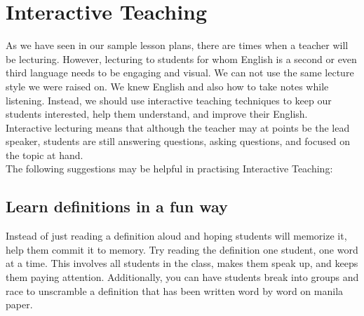 \chapter{Interactive Teaching}
As we have seen in our sample lesson plans, there are times when a teacher will be lecturing.  However, lecturing to students for whom English is a second or even third language needs to be engaging and visual.  We can not use the same lecture style we were raised on. We knew English and also how to take notes while listening. Instead, we should use interactive teaching techniques to keep our students interested, help them  understand, and improve their English. \\

Interactive lecturing means that although the teacher may at points be the lead speaker, students are still answering questions, asking questions, and focused on the topic at hand.\\

The following suggestions may be helpful in practising Interactive Teaching:

\section{Learn definitions in a fun way}
Instead of just reading a definition aloud and hoping students will memorize it, help them commit it to memory.  Try reading the definition one student, one word at a time.  This involves all students in the class, makes them speak up, and keeps them paying attention.  Additionally, you can have students break into groups and race to unscramble a definition that has been written word by word on manila paper.\\

